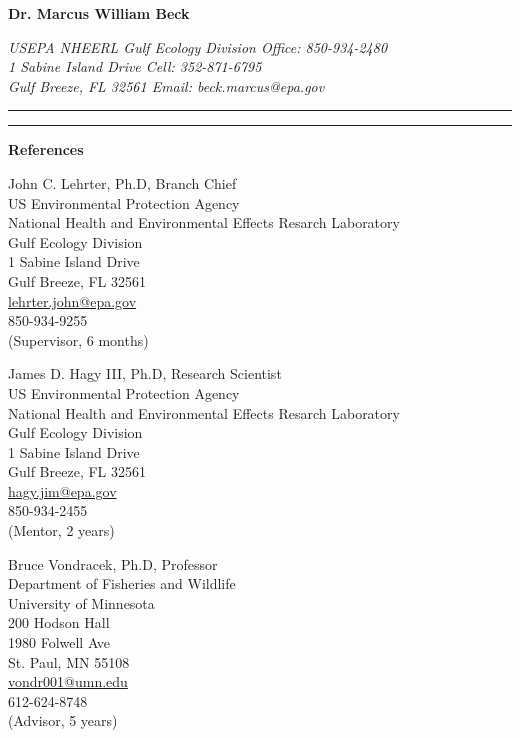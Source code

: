 \documentclass[letterpaper,12pt]{article}
\newcommand{\sectitle}[1]{\vspace{\baselineskip} \centerline{\large{{\bf #1}}}}
\begin{document}
\LARGE
\centerline{{\bf Dr. Marcus William Beck}}
\normalsize
\textit{USEPA NHEERL Gulf Ecology Division \hfill Office: 850-934-2480 \\
1 Sabine Island Drive \hfill Cell: 352-871-6795 \\
Gulf Breeze, FL 32561 \hfill Email: beck.marcus@epa.gov}
\vspace{4pt}
\hrule
\vspace{2pt}
\hrule
\vspace{4pt}


\sectitle{References}

\centering
John C. Lehrter, Ph.D, Branch Chief \\ 
US Environmental Protection Agency \\
National Health and Environmental Effects Resarch Laboratory \\
Gulf Ecology Division \\
1 Sabine Island Drive \\
Gulf Breeze, FL 32561 \\
\href{mailto:lehrter.john@epa.gov}{lehrter.john@epa.gov} \\
850-934-9255 \\
(Supervisor, 6 months) \\
\vspace{\baselineskip}

\centering
James D. Hagy III, Ph.D, Research Scientist  \\ 
US Environmental Protection Agency \\
National Health and Environmental Effects Resarch Laboratory \\
Gulf Ecology Division \\
1 Sabine Island Drive \\
Gulf Breeze, FL 32561 \\
\href{mailto:hagy.jim@epa.gov}{hagy.jim@epa.gov} \\
850-934-2455 \\
(Mentor, 2 years) \\
\vspace{\baselineskip}

Bruce Vondracek, Ph.D, Professor \\ 
Department of Fisheries and Wildlife \\
University of Minnesota \\
200 Hodson Hall \\
1980 Folwell Ave \\
St. Paul, MN 55108 \\
\href{mailto:vondr001@umn.edu}{vondr001@umn.edu} \\
612-624-8748 \\
(Advisor, 5 years) \\
\vspace{\baselineskip}

\end{document}
